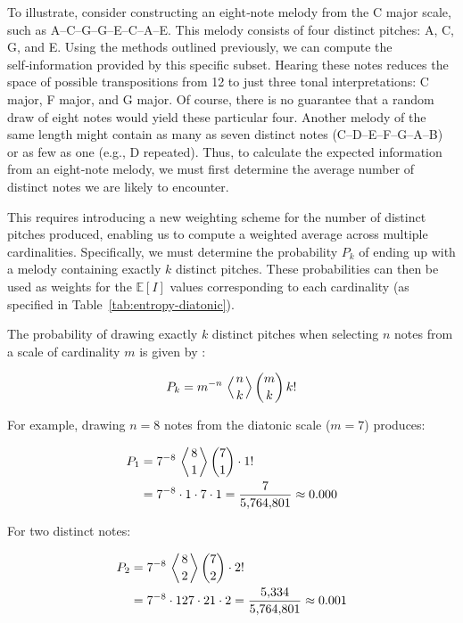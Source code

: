 \documentclass[10pt,twocolumn]{article}
\numberwithin{equation}{section} %
\begin{document}
    To illustrate, consider constructing an eight‑note melody from the C major scale, such as A–C–G–G–E–C–A–E. This melody consists of four distinct pitches: A, C, G, and E.
    Using the methods outlined previously, we can compute the self‑information provided by this specific subset.
    Hearing these notes reduces the space of possible transpositions from 12 to just three tonal interpretations: C major, F major, and G major.
    Of course, there is no guarantee that a random draw of eight notes would yield these particular four.
    Another melody of the same length might contain as many as seven distinct notes (C–D–E–F–G–A–B) or as few as one (e.g., D repeated).
    Thus, to calculate the expected information from an eight‑note melody, we must first determine the average number of distinct notes we are likely to encounter.

    This requires introducing a new weighting scheme for the number of distinct pitches produced, enabling us to compute a weighted average across multiple cardinalities.
    Specifically, we must determine the probability $P_k$ of ending up with a melody containing exactly $k$ distinct pitches.
    These probabilities can then be used as weights for the $\mathbb{E}[I]$ values corresponding to each cardinality (as specified in Table~\ref{tab:entropy-diatonic}).

    The probability of drawing exactly $k$ distinct pitches when selecting $n$ notes from a scale of cardinality $m$ is given by \citet{Feller1968}:

    \begin{equation}
        P_k = m^{-n} \, \left\langle \genfrac{}{}{0pt}{}{n}{k} \right\rangle \binom{m}{k} \, k!
        \label{eq:Pk}
    \end{equation}

    For example, drawing $n = 8$ notes from the diatonic scale ($m = 7$) produces:

    \begin{align*}
        P_1 &= 7^{-8} \, \left\langle \genfrac{}{}{0pt}{}{8}{1} \right\rangle \binom{7}{1} \cdot 1! \\
        &= 7^{-8} \cdot 1 \cdot 7 \cdot 1
        = \frac{7}{5{,}764{,}801} \approx 0.000
    \end{align*}

    For two distinct notes:

    \begin{align*}
        P_2 &= 7^{-8} \, \left\langle \genfrac{}{}{0pt}{}{8}{2} \right\rangle \binom{7}{2} \cdot 2! \\
        &= 7^{-8} \cdot 127 \cdot 21 \cdot 2
        = \frac{5{,}334}{5{,}764{,}801} \approx 0.001
    \end{align*}
\end{document}
